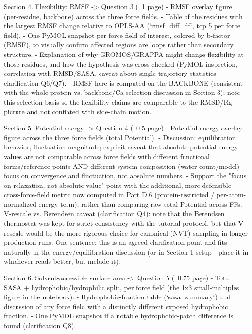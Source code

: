 Section 4. Flexibility: RMSF -> Question 3 (~1 page)
- RMSF overlay figure (per-residue, backbone) across the three force fields.
- Table of the residues with the largest RMSF change relative to OPLS-AA
  (`rmsf_diff_df`, top 5 per force field).
- One PyMOL snapshot per force field of interest, colored by b-factor (RMSF), to visually
  confirm affected regions are loops rather than secondary structure.
- Explanation of why GROMOS/GRAPPA might change flexibility at those residues, and how the
  hypothesis was cross-checked (PyMOL inspection, correlation with RMSD/SASA, caveat about
  single-trajectory statistics - clarification Q6/Q7).
- RMSF here is computed on the BACKBONE (consistent with the whole-protein vs. backbone/Ca
  selection discussion in Section 3); note this selection basis so the flexibility claims are
  comparable to the RMSD/Rg picture and not conflated with side-chain motion.

Section 5. Potential energy -> Question 4 (~0.5 page)
- Potential energy overlay figure across the three force fields (total Potential).
- Discussion: equilibration behavior, fluctuation magnitude; explicit caveat that absolute
  potential energy values are not comparable across force fields with different functional
  forms/reference points AND different system composition (water count/model) - focus on
  convergence and fluctuation, not absolute numbers.
- Support the "focus on relaxation, not absolute value" point with the additional, more
  defensible cross-force-field metric now computed in Part D.6 (protein-restricted /
  per-atom-normalized energy term), rather than comparing raw total Potential across FFs.
- V-rescale vs. Berendsen caveat (clarification Q4): note that the Berendsen thermostat was
  kept for strict consistency with the tutorial protocol, but that V-rescale would be the more
  rigorous choice for canonical (NVT) sampling in longer production runs. One sentence; this is
  an agreed clarification point and fits naturally in the energy/equilibration discussion (or
  in Section 1 setup - place it in whichever reads better, but include it).

Section 6. Solvent-accessible surface area -> Question 5 (~0.75 page)
- Total SASA + hydrophobic/hydrophilic split, per force field (the 1x3 small-multiples
  figure in the notebook).
- Hydrophobic-fraction table (`sasa_summary`) and discussion of any force field with a
  distinctly different exposed hydrophobic fraction.
- One PyMOL snapshot if a notable hydrophobic-patch difference is found (clarification Q8).

